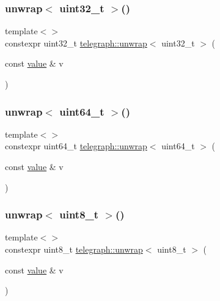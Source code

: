 \mbox{\label{namespacetelegraph_a9ec68c41802ea314d044e8008d883e23}} 
\subsubsection{\texorpdfstring{unwrap$<$ uint32\+\_\+t $>$()}{unwrap< uint32\_t >()}}
{\footnotesize\ttfamily template$<$$>$ \\
constexpr uint32\+\_\+t \hyperlink{namespacetelegraph_ae06614be6a21deb7e0112a24d559f72c}{telegraph\+::unwrap}$<$ uint32\+\_\+t $>$ (\begin{DoxyParamCaption}\item[{const \hyperlink{classtelegraph_1_1value}{value} \&}]{v }\end{DoxyParamCaption})}

\mbox{\label{namespacetelegraph_a3b0b76cf537c5924267bdc603cf5c95e}} 
\subsubsection{\texorpdfstring{unwrap$<$ uint64\+\_\+t $>$()}{unwrap< uint64\_t >()}}
{\footnotesize\ttfamily template$<$$>$ \\
constexpr uint64\+\_\+t \hyperlink{namespacetelegraph_ae06614be6a21deb7e0112a24d559f72c}{telegraph\+::unwrap}$<$ uint64\+\_\+t $>$ (\begin{DoxyParamCaption}\item[{const \hyperlink{classtelegraph_1_1value}{value} \&}]{v }\end{DoxyParamCaption})}

\mbox{\label{namespacetelegraph_a0f793729f8f7cc64a2b04d9413086a61}} 
\subsubsection{\texorpdfstring{unwrap$<$ uint8\+\_\+t $>$()}{unwrap< uint8\_t >()}}
{\footnotesize\ttfamily template$<$$>$ \\
constexpr uint8\+\_\+t \hyperlink{namespacetelegraph_ae06614be6a21deb7e0112a24d559f72c}{telegraph\+::unwrap}$<$ uint8\+\_\+t $>$ (\begin{DoxyParamCaption}\item[{const \hyperlink{classtelegraph_1_1value}{value} \&}]{v }\end{DoxyParamCaption})}

